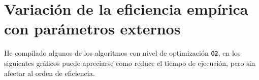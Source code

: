 \documentclass[a4]{article}
\begin{document}
\begin{figure}[H] \centering
\end{figure}

\section{Variación de la eficiencia empírica con parámetros externos}
\setcounter{subfigure}{0}

\begin{flushleft}
  He compilado algunos de los algoritmos con nivel de optimización
  \texttt{O2}, en los siguientes gráficos puede apreciarse como reduce
  el tiempo de ejecución, pero sin afectar al orden de eficiencia.
\end{flushleft}
\end{document}
